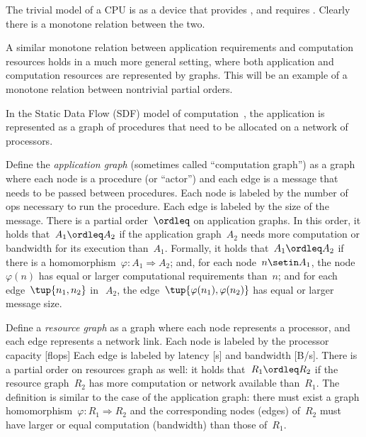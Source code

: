 The trivial model of a CPU is as a device that provides , and requires .
Clearly there is a monotone relation between the two.

\begin{figure}[h]
    \centering
    \caption{}
\end{figure}

A similar monotone relation between application requirements and computation resources holds in a much more general setting, where both application and computation resources are represented by graphs.
This will be an example of a monotone relation between nontrivial partial orders.

In the Static Data Flow (SDF) model of computation~\cite[Chapter 3]{sriram00,lee10}, the application is represented as a graph of procedures that need to be allocated on a network of processors.

\begin{figure*}[h]
    \centering
    \caption{}
\end{figure*}

Define the\emph{ application graph }(sometimes called ``computation graph'') as a graph where each node is a procedure (or ``actor'') and each edge is a message that needs to be passed between procedures.
Each node is labeled by the number of ops necessary to run the procedure.
Each edge is labeled by the size of the message.
There is a partial order~$\ordleq$ on application graphs.
In this order, it holds that~$A_1 \ordleq A_2$ if the application graph~$A_2$ needs more computation or bandwidth for its execution than~$A_1$.
Formally, it holds that~$A_1 \ordleq A_2$
if there is a homomorphism~$\varphi \colon A_1  \Rightarrow A_2$; and, for each node~$n \setin A_1$, the node~$\varphi(n)$ has equal or larger computational requirements than~$n$; and for each edge~$\tup{n_1,n_2}$
in~$~A_2$, the edge~$\tup{\varphi (n_1), \varphi (n_2)}$ has equal or larger message size.

Define a \emph{resource graph} as a graph where each node represents a processor, and each edge represents a network link.
Each node is labeled by the processor capacity [flops] Each edge is labeled by latency [s] and bandwidth [B/s].
There is a partial order on resources graph as well: it holds that~$R_1 \ordleq R_2$ if the resource graph~$R_2$ has more computation or network available than~$R_1$.
The definition is similar to the case of the application graph: there must exist a graph homomorphism~$\varphi \colon R_1  \Rightarrow R_2$
and the corresponding nodes (edges) of~$R_2$ must have larger or equal computation (bandwidth) than those of~$R_1$.

